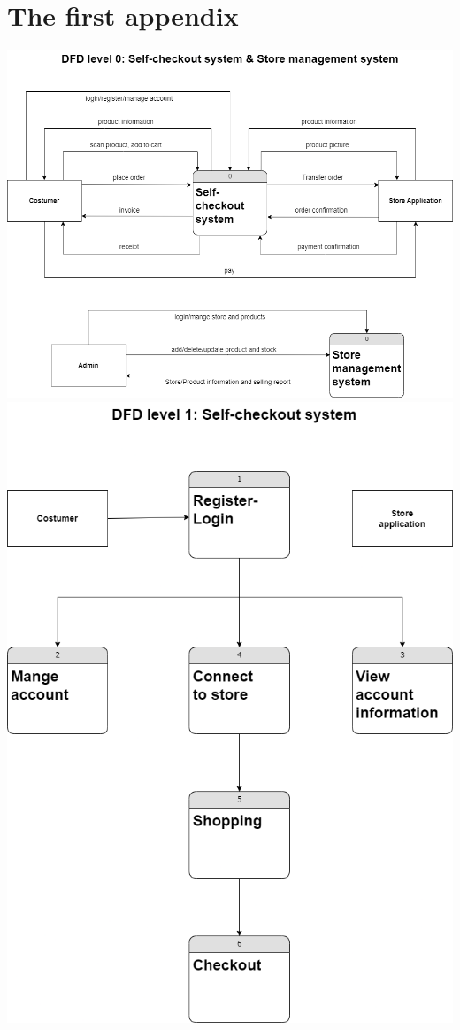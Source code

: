 \chapter{The first appendix}

    \begin{center}
    \includegraphics[scale=0.25]{pic/dataflow_p1.png}\\
    \vspace{2cm}
    \includegraphics[scale=0.25]{pic/dataflow_p2.png}

\end{center}
